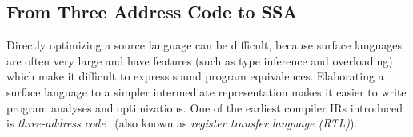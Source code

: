 \documentclass[acmsmall,screen,review]{acmart}
\newcommand{\ms}[1]{\ensuremath{\mathsf{#1}}}
\newcommand{\isotopessa}{\(\lambda_{\ms{SSA}}\)}
\begin{document}


\subsection{From Three Address Code to SSA}

\label{ssec:3addr-ssa}

Directly optimizing a source language can be difficult, because surface languages are often
very large and have features (such as type inference and overloading) which make it difficult
to express sound program equivalences. Elaborating a surface language to a simpler intermediate
representation makes it easier to write program analyses and optimizations. One of the earliest
compiler IRs introduced is \emph{three-address code}~\cite{allen-70-cfa} (also
known as \emph{register transfer language (RTL)}). 
\end{document}
